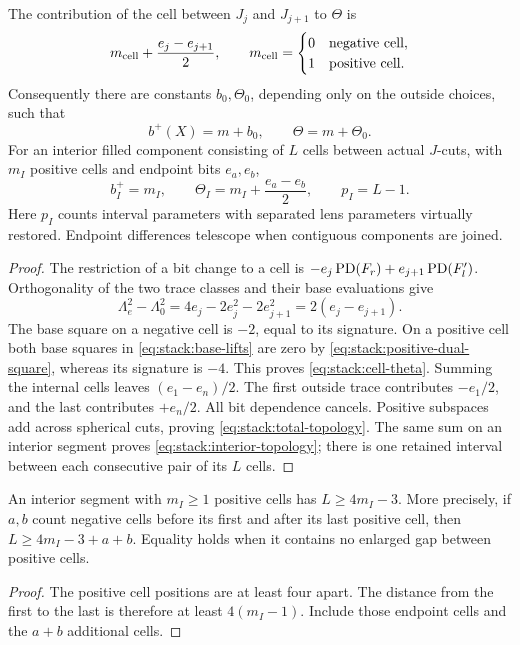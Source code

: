 \begin{lemma}
\label{lem:stack:telescope}
The contribution of the cell between \(J_j\) and \(J_{j+1}\) to
\(\Theta\) is
\begin{equation}
 m_{\rm cell}+\frac{e_j-e_{j+1}}2,
 \qquad
 m_{\rm cell}=\begin{cases}0&\text{negative cell},\\1&\text{positive cell}.
 \end{cases}
\label{eq:stack:cell-theta}
\end{equation}
Consequently there are constants \(b_0,\Theta_0\), depending only
on the outside choices, such that
\begin{equation}
 b^+(X)=m+b_0,\qquad \Theta=m+\Theta_0.
\label{eq:stack:total-topology}
\end{equation}
For an interior filled component consisting of \(L\) cells between
actual \(J\)-cuts, with \(m_I\) positive cells and endpoint bits
\(e_a,e_b\),
\begin{equation}
 b_I^+=m_I,\qquad \Theta_I=m_I+\frac{e_a-e_b}{2},\qquad p_I=L-1.
\label{eq:stack:interior-topology}
\end{equation}
Here \(p_I\) counts interval parameters with separated lens parameters
virtually restored.  Endpoint differences telescope when contiguous
components are joined.
\end{lemma}

\begin{proof}
The restriction of a bit change to a cell is
\(-e_j\operatorname{PD}(F_r)+e_{j+1}\operatorname{PD}(F'_l)\).  Orthogonality of the two
trace classes and their base evaluations give
\[
 \Lambda_e^2-\Lambda_0^2
 =4e_j-2e_j^2-2e_{j+1}^2=2(e_j-e_{j+1}).
\]
The base square on a negative cell is \(-2\), equal to its
signature.  On a positive cell both base squares in
\eqref{eq:stack:base-lifts} are zero by
\eqref{eq:stack:positive-dual-square}, whereas its signature is
\(-4\).  This proves \eqref{eq:stack:cell-theta}.
Summing the internal cells leaves \((e_1-e_n)/2\).
The first outside trace contributes \(-e_1/2\), and the last
contributes \(+e_n/2\).  All bit dependence cancels.  Positive
subspaces add across spherical cuts, proving
\eqref{eq:stack:total-topology}.  The same sum on an interior segment
proves \eqref{eq:stack:interior-topology}; there is one retained
interval between each consecutive pair of its \(L\) cells.
\end{proof}

\begin{corollary}[Spacing]
\label{cor:stack:interior}
An interior segment with \(m_I\ge1\) positive cells has
\(L\ge4m_I-3\).  More precisely, if \(a,b\) count negative cells
before its first and after its last positive cell, then
\(L\ge4m_I-3+a+b\).  Equality holds when it contains no enlarged
gap between positive cells.
\end{corollary}
\begin{proof}
The positive cell positions are at least four apart.  The distance
from the first to the last is therefore at least \(4(m_I-1)\).
Include those endpoint cells and the \(a+b\) additional cells.
\end{proof}

